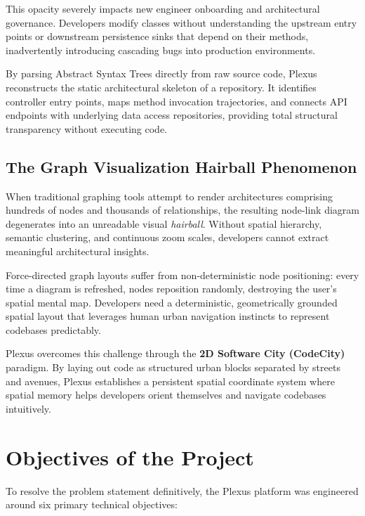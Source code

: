 \documentclass[11pt,a4paper,openany]{report}
\begin{document}
This opacity severely impacts new engineer onboarding and architectural governance. Developers modify classes without understanding the upstream entry points or downstream persistence sinks that depend on their methods, inadvertently introducing cascading bugs into production environments.

By parsing Abstract Syntax Trees directly from raw source code, Plexus reconstructs the static architectural skeleton of a repository. It identifies controller entry points, maps method invocation trajectories, and connects API endpoints with underlying data access repositories, providing total structural transparency without executing code.

\subsection{The Graph Visualization Hairball Phenomenon}
When traditional graphing tools attempt to render architectures comprising hundreds of nodes and thousands of relationships, the resulting node-link diagram degenerates into an unreadable visual \textit{hairball}. Without spatial hierarchy, semantic clustering, and continuous zoom scales, developers cannot extract meaningful architectural insights.

Force-directed graph layouts suffer from non-deterministic node positioning: every time a diagram is refreshed, nodes reposition randomly, destroying the user's spatial mental map. Developers need a deterministic, geometrically grounded spatial layout that leverages human urban navigation instincts to represent codebases predictably.

Plexus overcomes this challenge through the \textbf{2D Software City (CodeCity)} paradigm. By laying out code as structured urban blocks separated by streets and avenues, Plexus establishes a persistent spatial coordinate system where spatial memory helps developers orient themselves and navigate codebases intuitively.

\section{Objectives of the Project}
To resolve the problem statement definitively, the Plexus platform was engineered around six primary technical objectives:
\end{document}

